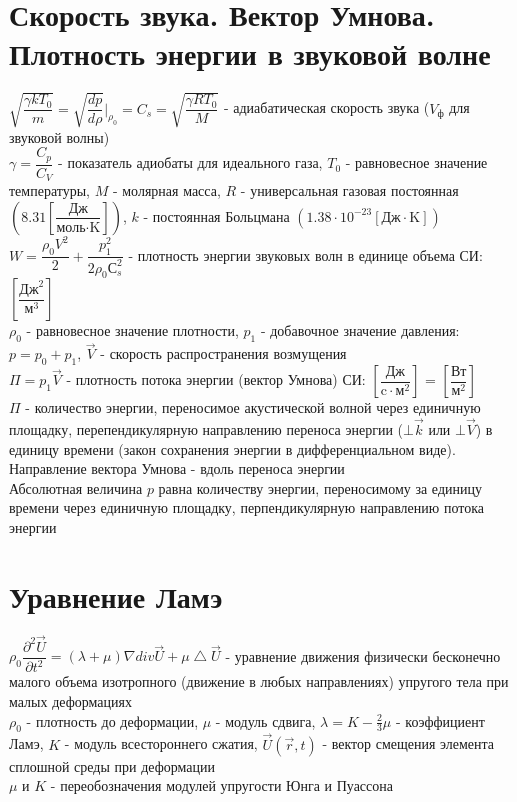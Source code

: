 \begin{multicols*}{2}
		\section{Скорость звука. Вектор Умнова. Плотность энергии в звуковой волне}
		$\sqrt{\dfrac{\gamma k T_0}{m}} = \sqrt{\dfrac{dp}{d\rho}}\bigg|_{\rho_0} = C_s = \sqrt{\dfrac{\gamma R T_0}{M}}$ - адиабатическая скорость звука ($V_\text{ф}$ для звуковой волны)\\
		$\gamma = \dfrac{C_p}{C_V}$ - показатель адиобаты для идеального газа, $T_0$ - равновесное значение температуры, $M$ - молярная масса, $R$ - универсальная газовая постоянная $\left(8.31 \left[\dfrac{\text{Дж}}{\text{моль}\cdot\text{K}}\right]\right)$, $k$ - постоянная Больцмана $\left(1.38\cdot10^{-23} \left[{\text{Дж}} \cdot \text{K}\right]\right)$\\
		$W = \dfrac{\rho_0 V^2}{2} + \dfrac{p_1^2}{2\rho_0 С_s^2}$ - плотность энергии звуковых волн в единице объема \quad СИ: $\left[\dfrac{\text{Дж}^2}{\text{м}^3}\right]$\\
		$\rho_0$ - равновесное значение плотности, $p_1$ - добавочное значение давления: $p = p_0 + p_1$, $\vec{V}$ - скорость распространения возмущения\\
		$\Pi = p_1 \vec{V}$ - плотность потока энергии (вектор Умнова) \quad СИ: $\left[\dfrac{\text{Дж}}{\text{c}\cdot \text{м}^2}\right]$ = $\left[\dfrac{\text{Вт}}{\text{м}^2}\right]$\\
		$\Pi$ - количество энергии, переносимое акустической волной через единичную площадку, перепендикулярную направлению переноса энергии ($\bot \vec{k}$ или $\bot \vec{V}$) в единицу времени (закон сохранения энергии в дифференциальном виде). Направление вектора Умнова - вдоль переноса энергии\\
		Абсолютная величина $p$ равна количеству энергии, переносимому за единицу времени через единичную площадку, перпендикулярную направлению потока энергии

		\section{Уравнение Ламэ}
		$\rho_0 \dfrac{\partial^2 \vec{U}}{\partial t^2} = (\lambda + \mu) \nabla div \vec{U} + \mu \bigtriangleup  \vec{U}$ - уравнение движения физически бесконечно малого объема изотропного (движение в любых направлениях) упругого тела при малых деформациях\\
		$\rho_0$ - плотность до деформации, $\mu$ - модуль сдвига, $\lambda = K - \frac{2}{3}\mu$ - коэффициент Ламэ, $K$ - модуль всестороннего сжатия, $\vec{U}(\vec{r}, t)$ - вектор смещения элемента сплошной среды при деформации\\
		$\mu$ и $K$ - переобозначения модулей упругости Юнга и Пуассона


\end{multicols*}
